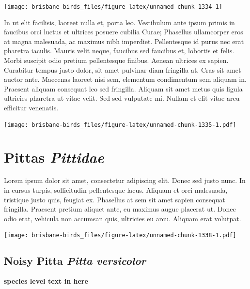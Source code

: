 \documentclass[]{book}
\let\origfigure\figure
\let\endorigfigure\endfigure
\renewenvironment{figure}[1][2] {
  \expandafter\origfigure\expandafter[H]
} {
  \endorigfigure
}
\begin{document}
\begin{figure}
\texttt{[image: brisbane-birds\_files/figure-latex/unnamed-chunk-1334-1]} \caption{insert figure caption}\label{fig:unnamed-chunk-1334}
\end{figure}

In ut elit facilisis, laoreet nulla et, porta leo. Vestibulum ante ipsum
primis in faucibus orci luctus et ultrices posuere cubilia Curae;
Phasellus ullamcorper eros at magna malesuada, ac maximus nibh
imperdiet. Pellentesque id purus nec erat pharetra iaculis. Mauris velit
neque, faucibus sed faucibus et, lobortis et felis. Morbi suscipit odio
pretium pellentesque finibus. Aenean ultrices ex sapien. Curabitur
tempus justo dolor, sit amet pulvinar diam fringilla at. Cras sit amet
auctor ante. Maecenas laoreet nisi sem, elementum condimentum sem
aliquam in. Praesent aliquam consequat leo sed fringilla. Aliquam sit
amet metus quis ligula ultricies pharetra ut vitae velit. Sed sed
vulputate mi. Nullam et elit vitae arcu efficitur venenatis.

\begin{figure}
\centering
\texttt{[image: brisbane-birds\_files/figure-latex/unnamed-chunk-1335-1.pdf]}
\caption{\label{fig:unnamed-chunk-1335}insert figure caption}
\end{figure}

\chapter{\texorpdfstring{Pittas
\emph{Pittidae}}{Pittas Pittidae}}\label{pittas-pittidae}

Lorem ipsum dolor sit amet, consectetur adipiscing elit. Donec sed justo
nunc. In in cursus turpis, sollicitudin pellentesque lacus. Aliquam et
orci malesuada, tristique justo quis, feugiat ex. Phasellus at sem sit
amet sapien consequat fringilla. Praesent pretium aliquet ante, eu
maximus augue placerat ut. Donec odio erat, vehicula non accumsan quis,
ultricies eu arcu. Aliquam erat volutpat.

\texttt{[image: brisbane-birds\_files/figure-latex/unnamed-chunk-1338-1.pdf]}

\section{\texorpdfstring{Noisy Pitta \emph{Pitta
versicolor}}{Noisy Pitta Pitta versicolor}}\label{noisy-pitta-pitta-versicolor}

\textbf{species level text in here}
\end{document}
